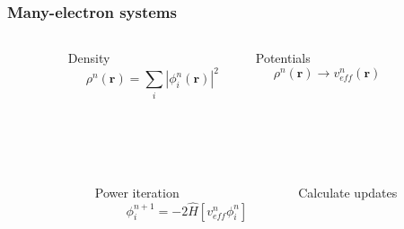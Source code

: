 \documentclass[mathserif, 10pt]{beamer}
\begin{document}

\begin{frame}
    \frametitle{Many-electron systems}
    \begin{columns}
    \begin{column}[b]{0.1\textwidth}
    \ \\
    \end{column}
    \begin{column}[b]{0.4\textwidth}
    \centering
    Density
    \begin{equation}
	\nonumber
	\rho^n(\boldsymbol{r}) = \sum_i |\phi_i^n(\boldsymbol{r})|^2
    \end{equation}
    \end{column}
    \begin{column}[b]{0.4\textwidth}
    \centering
    Potentials
    \begin{equation}   
	\nonumber
	\rho^n(\boldsymbol{r}) \rightarrow v_{eff}^n(\boldsymbol{r})
    \end{equation}
    \end{column}
    \begin{column}[b]{0.1\textwidth}
    \ \\
    \end{column}
    \end{columns}
    \ \\
    \ \\
    \pause
    \begin{columns}
    \begin{column}[b]{0.1\textwidth}
    \ \\
    \end{column}
    \begin{column}[b]{0.4\textwidth}
    \centering
    Power iteration
    \begin{equation}
	\nonumber
	\phi_i^{n+1} = -2\hat{H}\left[v_{eff}^n\phi_i^n\right]
    \end{equation}
    \end{column}
    \begin{column}[b]{0.4\textwidth}
    \centering
    Calculate updates

\end{column}
\end{columns}
\end{frame}
\end{document}

